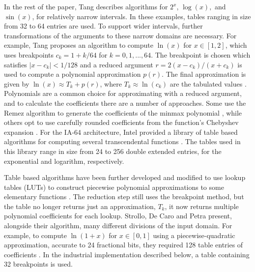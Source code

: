 \documentclass{fac}
\newcommand{\abs}[1]{\lvert#1\rvert}
\begin{document}
In the rest of the paper, Tang describes algorithms for $2^x$, $\log(x),$ and $\sin{(x)}$, for relatively narrow intervals. In these examples, tables ranging in size from 32 to 64 entries are used. To support wider intervals, further transformations of the arguments to these narrow domains are necessary. 
For example, Tang proposes an algorithm to compute $\ln(x)$ for $x\in[1,2]$, which uses breakpoints $c_k = 1 + k/64$ for $k=0,1,...,64$. The breakpoint is chosen which satisfies $\abs{x-c_k} < 1/128$ and a reduced argument $r=2(x-c_k)/(x+c_k)$ is used to compute a polynomial approximation $p(r)$. The final approximation is given by $\ln(x) \approx T_k + p(r)$, where $T_k \approx \ln(c_k)$ are the tabulated values \cite{tang1991table}.
Polynomials are a common choice for approximating with a reduced argument, and to calculate the coefficients there are a number of approaches. Some use the Remez algorithm to generate the coefficients of the minmax polynomial \cite{veidinger1960numerical,tang1991table}, while others opt to use carefully rounded coefficients from the function's Chebyshev expansion \cite{378099}. For the IA-64 architecture, Intel provided a library of table based algorithms for computing several transcendental functions \cite{harrison1999computation}. The tables used in this library range in size from 24 to 256 double extended entries, for the exponential and logarithm, respectively.

Table based algorithms have been further developed and modified to use lookup tables (LUTs) to construct piecewise polynomial approximations to some elementary functions \cite{strollo2011elementary,pineiro2005high}. The reduction step still uses the breakpoint method, but the table no longer returns just an approximation, $T_k$, it now returns multiple polynomial coefficients for each lookup. Strollo, De Caro and Petra present, alongside their algorithm, many different divisions of the input domain. For example, to compute $\ln(1+x)$ for $x\in[0,1]$ using a piecewise-quadratic approximation, accurate to 24 fractional bits, they required 128 table entries of coefficients \cite{strollo2011elementary}. In the industrial implementation described below, a table containing 32 breakpoints is used. 
\end{document}
